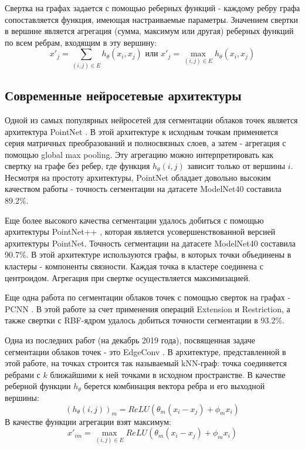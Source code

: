 \documentclass[]{article}
\begin{document}
Свертка на графах задается с помощью реберных функций - каждому ребру графа сопоставляется функция, имеющая настраиваемые параметры. Значением свертки в вершине является агрегация (сумма, максимум или другая) реберных функций по всем ребрам, входящим в эту вершину:
$$x'_j = \sum\limits_{(i,j) \in E} h_{\theta}(x_i, x_j) \text{ или } x'_j = \max\limits_{(i,j) \in E} h_{\theta}(x_i, x_j)$$

\subsection{Современные нейросетевые архитектуры}

Одной из самых популярных нейросетей для сегментации облаков точек является архитектура PointNet \cite{qi2017pointnet}. В этой архитектуре к исходным точкам применяется серия матричных преобразований и полносвязных слоев, а затем - агрегация с помощью global max pooling. Эту агрегацию можно интерпретировать как свертку на графе без ребер, где функция $h_{\theta}(i, j)$ зависит только от вершины $i$. Несмотря на простоту архитектуры, PointNet обладает довольно высоким качеством работы - точность сегментации на датасете ModelNet40 \cite{wu20153d} составила 89.2\%.

Еще более высокого качества сегментации удалось добиться с помощью архитектуры PointNet++ \cite{qi2017pointnet++}, которая является усовершенствованной версией архитектуры PointNet. Точность сегментации на датасете ModelNet40 составила 90.7\%. В этой архитектуре используются графы, в которых точки объединены в кластеры - компоненты связности. Каждая точка в кластере соединена с центроидом. Агрегация при свертке осуществляется максимизацией.

Еще одна работа по сегментации облаков точек с помощью сверток на графах - PCNN \cite{atzmon2018point}. В этой работе за счет применения операций Extension и Restriction, а также свертки с RBF-ядром удалось добиться точности сегментации в 93.2\%.

Одна из последних работ (на декабрь 2019 года), посвященная задаче сегментации облаков точек - это EdgeConv \cite{wang2019dynamic}. В архитектуре, представленной в этой работе, на точках строится так называемый kNN-граф: точка соединяется ребрами с $k$ ближайшими к ней точками в исходном пространстве. В качестве реберной функции $h_{\theta}$ берется комбинация вектора ребра и его выходной вершины:
$$(h_{\theta}(i,j))_m = ReLU(\theta_m (x_i - x_j) + \phi_m x_i)$$
В качестве функции агрегации взят максимум:
$$x'_{im} = \max\limits_{(i,j) \in E} ReLU(\theta_m (x_i - x_j) + \phi_m x_i)$$
\end{document}
